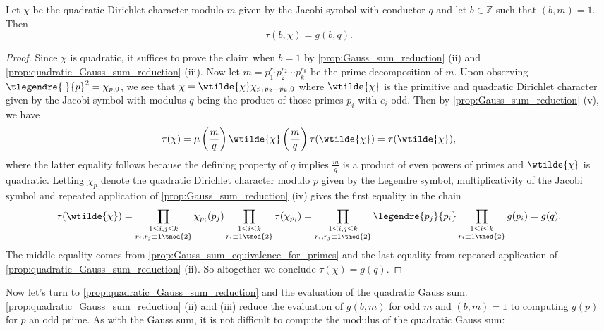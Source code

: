         \begin{theorem}
          Let $\chi$ be the quadratic Dirichlet character modulo $m$ given by the Jacobi symbol with conductor $q$ and let $b \in \mathbb{Z}$ such that $(b,m) = 1$. Then
          \[
            \tau(b,\chi) = g(b,q).
          \]
        \end{theorem}
        \begin{proof}
          Since $\chi$ is quadratic, it suffices to prove the claim when $b = 1$ by \cref{prop:Gauss_sum_reduction} (ii) and \cref{prop:quadratic_Gauss_sum_reduction} (iii). Now let $m = p_{1}^{r_{1}}p_{2}^{r_{2}} \cdots p_{k}^{r_{k}}$ be the prime decomposition of $m$. Upon observing $\tlegendre{\cdot}{p}^{2} = \chi_{p,0}$, we see that $\chi = \wtilde{\chi}\chi_{p_{1}p_{2} \cdots p_{k},0}$ where $\wtilde{\chi}$ is the primitive and quadratic Dirichlet character given by the Jacobi symbol with modulus $q$ being the product of those primes $p_{i}$ with $e_{i}$ odd. Then by \cref{prop:Gauss_sum_reduction} (v), we have
          \[
            \tau(\chi) = \mu\left(\frac{m}{q}\right)\wtilde{\chi}\left(\frac{m}{q}\right)\tau(\wtilde{\chi}) = \tau(\wtilde{\chi}),
          \]
          where the latter equality follows because the defining property of $q$ implies $\frac{m}{q}$ is a product of even powers of primes and $\wtilde{\chi}$ is quadratic. Letting $\chi_{p}$ denote the quadratic Dirichlet character modulo $p$ given by the Legendre symbol, multiplicativity of the Jacobi symbol and repeated application of \cref{prop:Gauss_sum_reduction} (iv) gives the first equality in the chain
          \[
            \tau(\wtilde{\chi}) = \prod_{\substack{1 \le i,j \le k \\ r_{i},r_{j} \equiv 1 \tmod{2}}}\chi_{p_{i}}(p_{j})\prod_{\substack{1 \le i \le k \\ r_{i} \equiv 1 \tmod{2}}}\tau(\chi_{p_{i}}) = \prod_{\substack{1 \le i,j \le k \\ r_{i},r_{j} \equiv 1 \tmod{2}}}\legendre{p_{j}}{p_{i}}\prod_{\substack{1 \le i \le k \\ r_{i} \equiv 1 \tmod{2}}}g(p_{i}) = g(q).
          \]
          The middle equality comes from \cref{prop:Gauss_sum_equivalence_for_primes} and the last equality from repeated application of \cref{prop:quadratic_Gauss_sum_reduction} (ii). So altogether we conclude $\tau(\chi) = g(q)$.
        \end{proof}

        Now let's turn to \cref{prop:quadratic_Gauss_sum_reduction} and the evaluation of the quadratic Gauss sum. \cref{prop:quadratic_Gauss_sum_reduction} (ii) and (iii) reduce the evaluation of $g(b,m)$ for odd $m$ and $(b,m) = 1$ to computing $g(p)$ for $p$ an odd prime. As with the Gauss sum, it is not difficult to compute the modulus of the quadratic Gauss sum:

